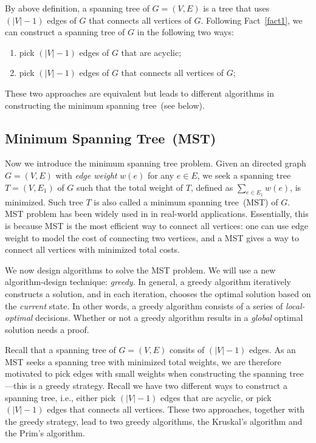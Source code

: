 By above definition, a spanning tree of $G = (V,E)$ is a tree that uses $(|V| - 1)$ edges
of $G$ that connects all vertices of $G$.
Following Fact~\ref{fact1}, we can construct a spanning tree of $G$
in the following two ways:
\vspace*{-\topsep}
\begin{enumerate}
\item pick $(|V|-1)$ edges of $G$ that are acyclic;
\item pick $(|V|-1)$ edges of $G$ that connects all vertices of $G$;
\end{enumerate}
These two approaches are equivalent but leads to different algorithms
in constructing the minimum spanning tree~(see below).


\subsection*{Minimum Spanning Tree~(MST)}

Now we introduce the minimum spanning tree problem.
Given an directed graph $G = (V, E)$ with \emph{edge weight} $w(e)$ for any $e\in E$,
we seek a spanning tree $T = (V, E_1)$ of $G$ such that 
the total weight of $T$, defined as $\sum_{e\in E_1} w(e)$, is minimized.
Such tree $T$ is also called a minimum spanning tree~(MST) of $G$.
MST problem has been widely used in in real-world applications.
Essentially, this is because MST is the most efficient way to connect all
vertices: one can use edge weight to model the cost of connecting
two vertices, and a MST gives a way to connect all vertices with minimized total costs.

We now design algorithms to solve the MST problem.
We will use a new algorithm-design technique: \emph{greedy}.
In general, a greedy algorithm iteratively constructs a solution,
and in each iteration, chooses the optimal solution based on the \emph{current} state.
In other words, a greedy algorithm consists of a series of \emph{local-optimal} decisions.
Whether or not a greedy algorithm results in a \emph{global} optimal solution
needs a proof.

Recall that a spanning tree of $G = (V, E)$ consits of $(|V| - 1)$ edges.
As an MST seeks a spanning tree with minimized total weights,
we are therefore motivated to pick edges with small weights when constructing
the spanning tree---this is a greedy strategy.
Recall we have two different ways to construct a spanning tree, i.e., 
either pick $(|V|-1)$ edges that are acyclic,
or pick $(|V|-1)$ edges that connects all vertices.
These two approaches, together with the greedy strategy,
lead to two greedy algorithms, the Kruskal's algorithm and the Prim's algorithm.

